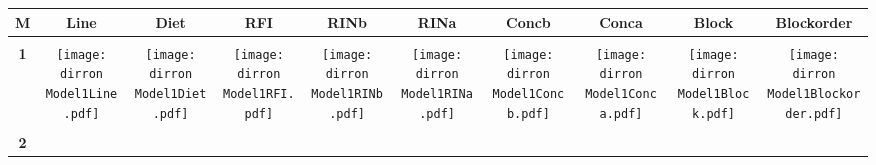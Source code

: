 \documentclass[landscape]{article}
\def \dirron {U:/R/RA/Data/RFI-newdata/resultpairednocbc/Model1.Line.Diet.RFI.Concb.RINb.Conca.RINa.Block.Blockorder/}
\begin{document}
\begin{table}
\Huge
\centering
\begin{tabular}{cccccccccc}
      {\Huge \textbf{M}} 
      & {\Huge\textbf{ Line}} 
      &{\Huge \textbf{Diet}} 
      & {\Huge \textbf{RFI}}
      &{\Huge\textbf{ RINb}} 
      &{\Huge \textbf{RINa}} 
      &{\Huge \textbf{Concb} } 
      &{\Huge \textbf{Conca} }
      &{\Huge \textbf{Block}} 
      &{\Huge \textbf{Blockorder}}
      \\[3.5pt]
      \hline
      \\[3.5pt]
      {\Huge \textbf{1}} 
      &\texttt{[image: \\dirron Model1Line.pdf]}
      &\texttt{[image: \\dirron Model1Diet.pdf]}
      &\texttt{[image: \\dirron Model1RFI.pdf]}
      &\texttt{[image: \\dirron Model1RINb.pdf]}
      &\texttt{[image: \\dirron Model1RINa.pdf]}
      &\texttt{[image: \\dirron Model1Concb.pdf]}
      &\texttt{[image: \\dirron Model1Conca.pdf]}
      &\texttt{[image: \\dirron Model1Block.pdf]}
      &\texttt{[image: \\dirron Model1Blockorder.pdf]}
     \\[3.5pt]
     \hline
     \\[3.5pt]
     {\Huge \textbf{2}} 
      

\end{tabular}
\end{table}
\end{document}
